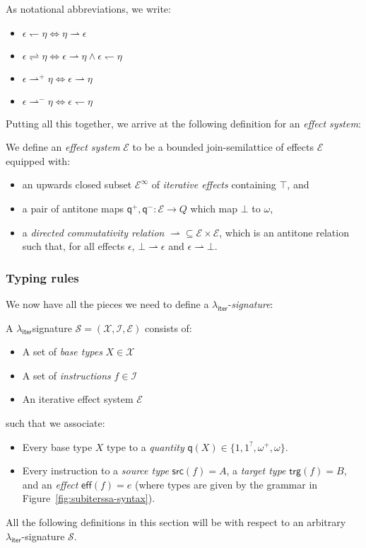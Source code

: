 \documentclass[acmsmall,screen,review]{acmart}
\newcommand{\mc}[1]{\ensuremath{\mathcal{#1}}}
\newcommand{\ms}[1]{\ensuremath{\mathsf{#1}}}
\newcommand{\subiterssa}{\(\lambda_{\ms{iter}}\)}
\newcommand{\rightmove}{\rightharpoonup}
\newcommand{\leftmove}{\leftharpoondown}
\newcommand{\slides}{\rightleftharpoons}
\newcommand{\delq}{1^?}
\newcommand{\cpyq}{\omega^+}
\newcommand{\topq}{\omega}
\newcommand{\alquant}{\ms{q}}
\begin{document}
As notational abbreviations, we write:
  \begin{itemize}
    \item $\epsilon \leftmove \eta \iff \eta \rightmove \epsilon$
    \item $\epsilon \slides \eta \iff \epsilon \rightmove \eta \land \epsilon \leftmove \eta$
    \item $\epsilon \rightmove^+ \eta \iff \epsilon \rightmove \eta$
    \item $\epsilon \rightmove^- \eta \iff \epsilon \leftmove \eta$
  \end{itemize}

 
Putting all this together, we arrive at the following definition for an
\emph{effect system}:
\begin{definition}
  We define an \emph{effect system} $\mc{E}$ to be a bounded join-semilattice of effects $\mc{E}$
  equipped with:
  \begin{itemize}
  \item an upwards closed subset $\mc{E}^\infty$ of \emph{iterative effects} containing $\top$, and
  \item a pair of antitone maps $\alquant^+, \alquant^- : \mc{E} \to Q$ which map $\bot$ to $\topq$,
  \item a \emph{directed commutativity relation} $\rightmove \subseteq \mc{E} \times \mc{E}$,
  which is an antitone relation   such that, for all effects
  $\epsilon$, $\bot \rightmove \epsilon$ and $\epsilon \rightmove \bot$. 
  \end{itemize}

\end{definition}

\subsubsection{Typing rules}

We now have all the pieces we need to define a \subiterssa{}-\emph{signature}:
\begin{definition}[\subiterssa-signature]
  A \subiterssa signature $\mc{S} = (\mc{X}, \mc{I}, \mc{E})$ consists of:
  \begin{itemize}
    \item A set of \emph{base types} $X \in \mc{X}$
    \item A set of \emph{instructions} $f \in \mc{I}$
    \item An iterative effect system $\mc{E}$
  \end{itemize}
  such that we associate:
  \begin{itemize}
    \item Every base type $X$ type to a \emph{quantity} $\ms{q}(X) \in \{1, \delq, \cpyq, \topq\}$.
    \item Every instruction to a \emph{source type} $\ms{src}(f) = A$, a \emph{target type}
    $\ms{trg}(f) = B$, and an \emph{effect} $\ms{eff}(f) = e$ (where types are given by the grammar
    in Figure~\ref{fig:subiterssa-syntax}).
  \end{itemize}
\end{definition}
All the following definitions in this section will be with respect to an arbitrary
\subiterssa{}-signature $\mc{S}$. 
\end{document}
